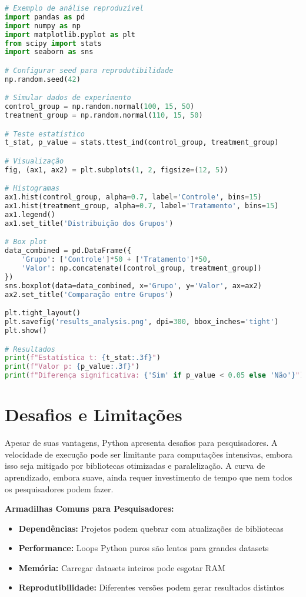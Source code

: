\begin{pythonbox}
\begin{lstlisting}[language=Python]
# Exemplo de análise reproduzível
import pandas as pd
import numpy as np
import matplotlib.pyplot as plt
from scipy import stats
import seaborn as sns

# Configurar seed para reprodutibilidade
np.random.seed(42)

# Simular dados de experimento
control_group = np.random.normal(100, 15, 50)
treatment_group = np.random.normal(110, 15, 50)

# Teste estatístico
t_stat, p_value = stats.ttest_ind(control_group, treatment_group)

# Visualização
fig, (ax1, ax2) = plt.subplots(1, 2, figsize=(12, 5))

# Histogramas
ax1.hist(control_group, alpha=0.7, label='Controle', bins=15)
ax1.hist(treatment_group, alpha=0.7, label='Tratamento', bins=15)
ax1.legend()
ax1.set_title('Distribuição dos Grupos')

# Box plot
data_combined = pd.DataFrame({
    'Grupo': ['Controle']*50 + ['Tratamento']*50,
    'Valor': np.concatenate([control_group, treatment_group])
})
sns.boxplot(data=data_combined, x='Grupo', y='Valor', ax=ax2)
ax2.set_title('Comparação entre Grupos')

plt.tight_layout()
plt.savefig('results_analysis.png', dpi=300, bbox_inches='tight')
plt.show()

# Resultados
print(f"Estatística t: {t_stat:.3f}")
print(f"Valor p: {p_value:.3f}")
print(f"Diferença significativa: {'Sim' if p_value < 0.05 else 'Não'}")
\end{lstlisting}
\end{pythonbox}

\section{Desafios e Limitações}

Apesar de suas vantagens, Python apresenta desafios para pesquisadores. A velocidade de execução pode ser limitante para computações intensivas, embora isso seja mitigado por bibliotecas otimizadas e paralelização. A curva de aprendizado, embora suave, ainda requer investimento de tempo que nem todos os pesquisadores podem fazer.

\begin{warningbox}
\textbf{Armadilhas Comuns para Pesquisadores:}
\begin{itemize}
    \item \textbf{Dependências:} Projetos podem quebrar com atualizações de bibliotecas
    \item \textbf{Performance:} Loops Python puros são lentos para grandes datasets
    \item \textbf{Memória:} Carregar datasets inteiros pode esgotar RAM
    \item \textbf{Reprodutibilidade:} Diferentes versões podem gerar resultados distintos
\end{itemize}
\end{warningbox}

